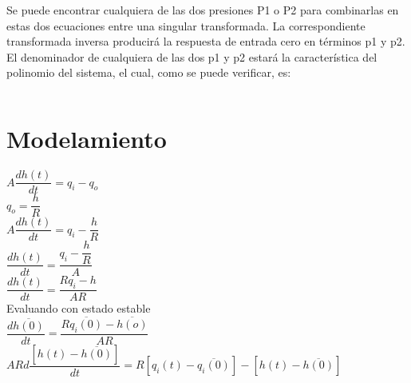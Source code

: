 \documentclass[a4paper,12pt,twoside]{proyectotanquesecci}
\begin{document}
\begin{equation}
\end{equation}

Se puede encontrar cualquiera de las dos presiones P1 o P2 para combinarlas en estas dos ecuaciones entre una singular transformada. La correspondiente transformada inversa producirá la respuesta de entrada cero en términos p1 y p2. El denominador de cualquiera de las dos p1 y p2 estará la característica del polinomio del sistema, el cual, como se puede verificar, es:

\begin{equation}
\end{equation}














\newpage





\section{Modelamiento}

$A\dfrac {dh\left( t\right) }{dt}=q_{i}-q_{o}$ \\
$q_{o}=\dfrac{h}{R}$ \\

$A\dfrac {dh\left( t\right) }{dt}=q_{i}-\dfrac {h}{R}$ \\
$\dfrac {dh\left( t\right) }{dt}=\dfrac {q_{i}-\dfrac {h}{R}}{A}$ \\
$\dfrac {dh\left( t\right) }{dt}=\dfrac {Rq_{i}-h}{AR}$ \\


Evaluando con estado estable \\
$\dfrac {d\overline {h\left( 0\right) }}{dt}=\dfrac {R\overline {q_{i}\left( 0\right) }-\overline {h\left( o\right) }}{AR}$ \\

$ARd\dfrac {\left[ h\left( t\right) -\overline {h\left( 0\right) }\right] }{dt}=R\left[ q_{i}\left( t\right) -\overline {q_{i}\left( 0\right) }\right] -\left[ h\left( t\right) -\overline {h\left( 0\right) }\right]$ \\
\end{document}
